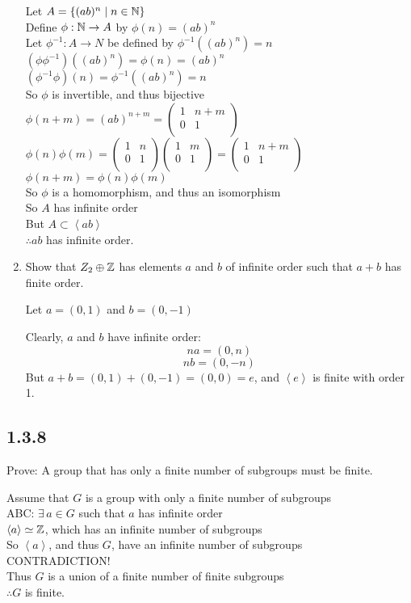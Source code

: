 \documentclass[letterpaper,12pt,fleqn]{article}
\newcommand{\cycle}[1]{\left<#1\right>}
\newcommand{\p}{\phi}
\newcommand{\mtx}[4]{\begin{pmatrix}
    #1 & #2 \\
    #3 & #4 \\
  \end{pmatrix}}
\begin{document}
\begin{enumerate}
  Let $A=\{(ab)^n\mid n\in\mathbb{N}\}$ \\
  Define $\p:\N\to A$ by $\p(n)=(ab)^n$ \\
  Let $\p^{-1}:A\to N$ be defined by $\p^{-1}\left((ab)^n\right)=n$ \\
  $(\p\p^{-1})\left((ab)^n\right)=\p(n)=(ab)^n$ \\
  $(\p^{-1}\p)(n)=\p^{-1}\left((ab)^n\right)=n$ \\
  So $\p$ is invertible, and thus bijective \\
  $\p(n+m)=(ab)^{n+m}=\mtx{1}{n+m}{0}{1}$ \\
  $\p(n)\p(m)=\mtx{1}{n}{0}{1}\mtx{1}{m}{0}{1}=\mtx{1}{n+m}{0}{1}$ \\
  $\p(n+m)=\p(n)\p(m)$ \\
  So $\p$ is a homomorphism, and thus an isomorphism \\
  So $A$ has infinite order \\
  But $A\subset\cycle{ab}$ \\
  $\therefore ab$ has infinite order.

\item Show that $Z_2\oplus\mathbb{Z}$ has elements $a$ and $b$ of infinite order such
  that $a+b$ has finite order.

  Let $a=(0,1)$ and $b=(0,-1)$

  Clearly, $a$ and $b$ have infinite order:
  \[na=(0,n)\]
  \[nb=(0,-n)\]
  But $a+b=(0,1)+(0,-1)=(0,0)=e$, and $\cycle{e}$ is finite with order 1.
\end{enumerate}

\subsection*{1.3.8}

Prove: A group that has only a finite number of subgroups must be finite.

Assume that $G$ is a group with only a finite number of subgroups \\
ABC: $\exists\,a\in G$ such that $a$ has infinite order \\
$\cycle{a}\simeq\Z$, which has an infinite number of subgroups \\
So $\cycle{a}$, and thus $G$, have an infinite number of subgroups \\
CONTRADICTION! \\
Thus $G$ is a union of a finite number of finite subgroups \\
$\therefore G$ is finite.
\end{document}
